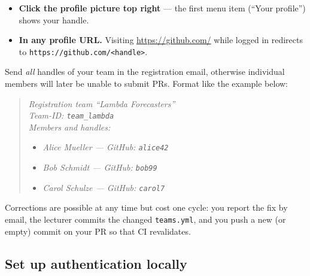 \documentclass[
  english,
  letterpaper,
]{scrbook}
\providecommand{\tightlist}{%
  \setlength{\itemsep}{0pt}\setlength{\parskip}{0pt}}
\begin{document}
\begin{itemize}
\tightlist
\item
  \textbf{Click the profile picture top right} --- the first menu item
  (``Your profile'') shows your handle.
\item
  \textbf{In any profile URL.} Visiting \url{https://github.com/} while
  logged in redirects to
  \texttt{https://github.com/\textless{}handle\textgreater{}}.
\end{itemize}

\begin{tcolorbox}[enhanced jigsaw, arc=.35mm, bottomrule=.15mm, bottomtitle=1mm, breakable, colback=white, colbacktitle=quarto-callout-important-color!10!white, colframe=quarto-callout-important-color-frame, coltitle=black, left=2mm, leftrule=.75mm, opacityback=0, opacitybacktitle=0.6, rightrule=.15mm, title=\textcolor{quarto-callout-important-color}{\faExclamation}\hspace{0.5em}{Send handles to the lecturer}, titlerule=0mm, toprule=.15mm, toptitle=1mm]

Send \emph{all} handles of your team in the registration email,
otherwise individual members will later be unable to submit PRs. Format
like the example below:

\begin{quote}
\emph{Registration team ``Lambda Forecasters''}\\
\emph{Team-ID: \texttt{team\_lambda}}\\
\emph{Members and handles:}

\begin{itemize}
\tightlist
\item
  \emph{Alice Mueller --- GitHub: \texttt{alice42}}
\item
  \emph{Bob Schmidt --- GitHub: \texttt{bob99}}
\item
  \emph{Carol Schulze --- GitHub: \texttt{carol7}}
\end{itemize}
\end{quote}

Corrections are possible at any time but cost one cycle: you report the
fix by email, the lecturer commits the changed \texttt{teams.yml}, and
you push a new (or empty) commit on your PR so that CI revalidates.

\end{tcolorbox}

\subsection{Set up authentication
locally}\label{set-up-authentication-locally}
\end{document}
